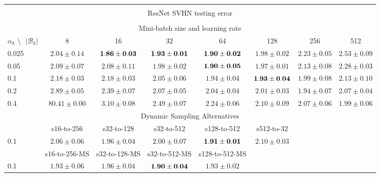 \documentclass[10pt,journal,compsoc]{IEEEtran}
\begin{document}
\begin{table*}[!htbp]
\begin{center}
{\begin{tabular}{|l|c|c|c|c|c|c|c|}
\multicolumn{8}{|c|}{} \\
\multicolumn{8}{|c|}{ResNet SVHN testing error} \\
\multicolumn{8}{|c|}{} \\
\hline
\multicolumn{8}{|c|}{Mini-batch size and learning rate} \\
\hline
$\alpha_k$ \textbackslash $ \text{   } {|\mathcal{B}_k|}$ & 8 & 16 & 32 & 64 & 128 & 256 & 512 \\
\hline
0.025 & $2.04\pm0.14$ & $\bf 1.86\pm0.03$ & $\bf 1.93\pm0.01$ & $\bf 1.90\pm0.02$ & $1.98\pm0.02$ & $2.23\pm0.05$ & $2.53\pm0.09$ \\
\hline
0.05  & $2.09\pm0.07$ & $2.08\pm0.11$ & $1.98\pm0.02$ & $\bf 1.90\pm0.05$ & $1.97\pm0.01$ & $2.13\pm0.08$ & $2.28\pm0.03$ \\
\hline
0.1   & $2.18\pm0.03$ & $2.18\pm0.03$ & $2.05\pm0.06$ & $1.94\pm0.04$ & $\bf 1.93\pm0.04$ & $1.99\pm0.08$ & $2.13\pm0.10$ \\
\hline
0.2   & $2.89\pm0.05$ & $2.39\pm0.07$ & $2.07\pm0.05$ & $2.04\pm0.04$ & $2.01\pm0.03$ & $1.94\pm0.07$ & $2.07\pm0.04$ \\
\hline
0.4   & $80.41\pm0.00$ & $3.10\pm0.08$ & $2.49\pm0.07$ & $2.24\pm0.06$ & $2.10\pm0.09$ & $2.07\pm0.06$ & $1.99\pm0.06$ \\
\hline
\multicolumn{8}{|c|}{Dynamic Sampling Alternatives}\\
\hline
& s16-to-256  & s32-to-128 & s32-to-512 & s128-to-512 & s512-to-32 & &\\
\hline
0.1   & $2.06\pm0.06$ &  $1.96\pm0.04$ & $2.00\pm0.07$ & $\bf 1.91\pm0.01$ & $2.10\pm0.03$ & & \\
\hline
& s16-to-256-MS & s32-to-128-MS & s32-to-512-MS & s128-to-512-MS & & &\\
\hline
0.1 & $1.93\pm0.06$ & $1.96\pm0.04$ & $\bf 1.90\pm0.04$ & $1.93\pm0.02$ & & & \\
\hline
\end{tabular}}
\end{center}
\end{table*}
\end{document}

